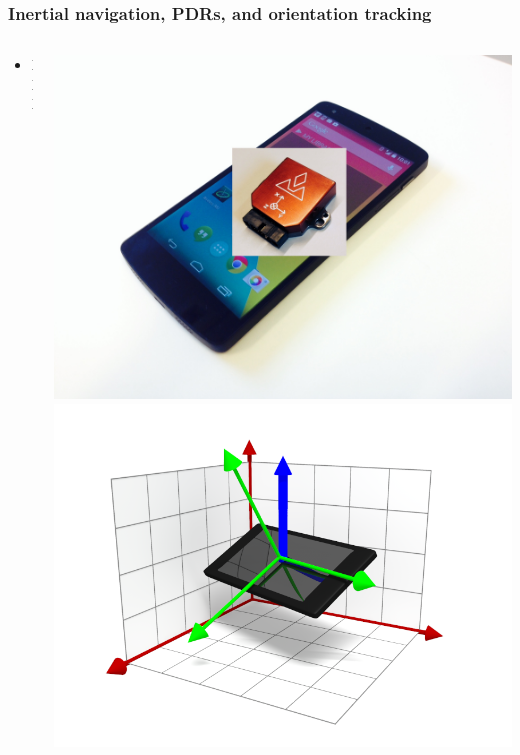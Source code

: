\documentclass[xcolor=svgnames,english,handout]{beamer}
\begin{document}
\begin{frame}
  \frametitle{Inertial navigation, PDRs, and orientation tracking}

  \begin{columns}
  \begin{column}{0.6\textwidth}
  \begin{itemize}[<+->]       
  \item XXX
  \end{itemize}
  \end{column}
  \begin{column}{0.4\textwidth}
  \includegraphics[width=\columnwidth]{mobile2} \\
  \includegraphics[width=\columnwidth]{grav}
  \end{column}
  \end{columns}
\end{frame}
\end{document}
